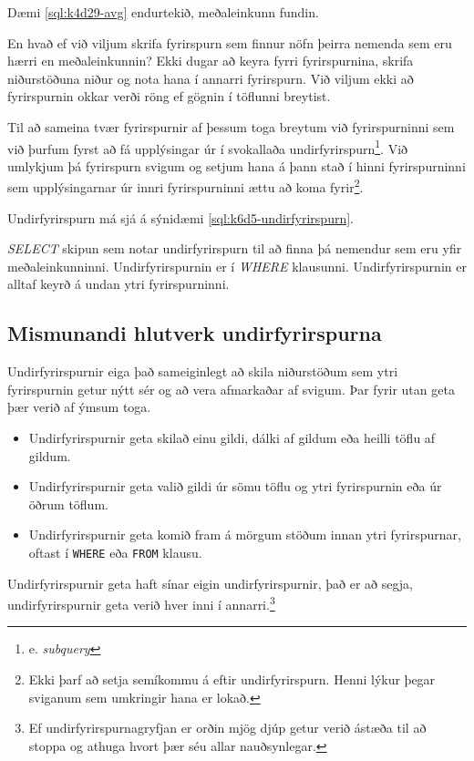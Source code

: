 \begin{example}
\caption[Meðaltal - upprifjun]{Dæmi \ref{sql:k4d29-avg} endurtekið, meðaleinkunn fundin.}
\label{sql:k6d6-avg-upprifjun}
\centering
{}
\end{example}

En hvað ef við viljum skrifa fyrirspurn sem finnur nöfn þeirra nemenda sem eru hærri en meðaleinkunnin? Ekki dugar að keyra fyrri fyrirspurnina, skrifa niðurstöðuna niður og nota hana í annarri fyrirspurn. Við viljum ekki að fyrirspurnin okkar verði röng ef gögnin í töflunni breytist.

Til að sameina tvær fyrirspurnir af þessum toga breytum við fyrirspurninni sem við þurfum fyrst að fá upplýsingar úr í svokallaða undirfyrirspurn\footnote{e. \emph{subquery}}. Við umlykjum þá fyrirspurn svigum og setjum hana á þann stað í hinni fyrirspurninni sem upplýsingarnar úr innri fyrirspurninni ættu að koma fyrir\footnote{Ekki þarf að setja semíkommu á eftir undirfyrirspurn. Henni lýkur þegar sviganum sem umkringir hana er lokað.}.

Undirfyrirspurn má sjá á sýnidæmi \ref{sql:k6d5-undirfyrirspurn}.
\begin{example}
\caption[Undirfyrirspurn]{\emph{SELECT} skipun sem notar undirfyrirspurn til að finna þá nemendur sem eru yfir meðaleinkunninni. Undirfyrirspurnin er í \emph{WHERE} klausunni. Undirfyrirspurnin er alltaf keyrð á undan ytri fyrirspurninni.}
\label{sql:k6d5-undirfyrirspurn}
\centering
{}
\end{example}
\subsection{Mismunandi hlutverk undirfyrirspurna}
Undirfyrirspurnir eiga það sameiginlegt að skila niðurstöðum sem ytri fyrirspurnin getur nýtt sér og að vera afmarkaðar af svigum. Þar fyrir utan geta þær verið af ýmsum toga.
\begin{itemize}
 \item Undirfyrirspurnir geta skilað einu gildi, dálki af gildum eða heilli töflu af gildum.
 \item Undirfyrirspurnir geta valið gildi úr sömu töflu og ytri fyrirspurnin eða úr öðrum töflum.
 \item Undirfyrirspurnir geta komið fram á mörgum stöðum innan ytri fyrirspurnar, oftast í \verb|WHERE| eða \verb|FROM| klausu.
\end{itemize}
Undirfyrirspurnir geta haft sínar eigin undirfyrirspurnir, það er að segja, undirfyrirspurnir geta verið hver inni í annarri.\footnote{Ef undirfyrirspurnagryfjan er orðin mjög djúp getur verið ástæða til að stoppa og athuga hvort þær séu allar nauðsynlegar.}

